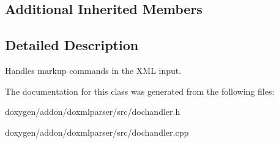 \subsection*{Additional Inherited Members}


\subsection{Detailed Description}
Handles markup commands in the X\+ML input. 



The documentation for this class was generated from the following files\+:\begin{DoxyCompactItemize}
\item 
doxygen/addon/doxmlparser/src/dochandler.\+h\item 
doxygen/addon/doxmlparser/src/dochandler.\+cpp\end{DoxyCompactItemize}
